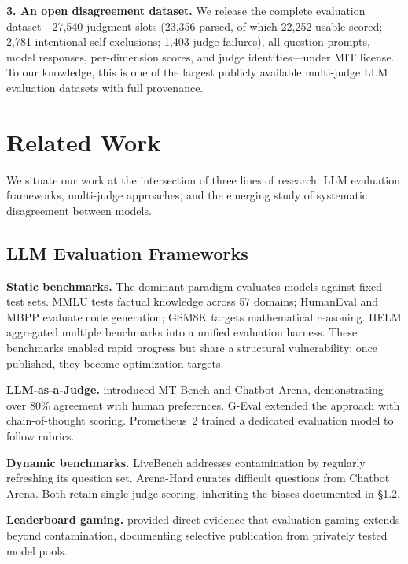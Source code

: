 \documentclass{article}
\begin{document}
\textbf{3. An open disagreement dataset.} We release the complete evaluation dataset---27,540 judgment slots (23,356 parsed, of which 22,252 usable-scored; 2,781 intentional self-exclusions; 1,403 judge failures), all question prompts, model responses, per-dimension scores, and judge identities---under MIT license. To our knowledge, this is one of the largest publicly available multi-judge LLM evaluation datasets with full provenance.


\section{Related Work}

We situate our work at the intersection of three lines of research: LLM evaluation frameworks, multi-judge approaches, and the emerging study of systematic disagreement between models.

\subsection{LLM Evaluation Frameworks}

\textbf{Static benchmarks.} The dominant paradigm evaluates models against fixed test sets. MMLU \citep{hendrycks2021measuring} tests factual knowledge across 57 domains; HumanEval \citep{chen2021evaluating} and MBPP \citep{austin2021program} evaluate code generation; GSM8K \citep{cobbe2021training} targets mathematical reasoning. HELM \citep{liang2023holistic} aggregated multiple benchmarks into a unified evaluation harness. These benchmarks enabled rapid progress but share a structural vulnerability: once published, they become optimization targets.

\textbf{LLM-as-a-Judge.} \citet{zheng2023judging} introduced MT-Bench and Chatbot Arena, demonstrating over 80\% agreement with human preferences. G-Eval \citep{liu2023geval} extended the approach with chain-of-thought scoring. Prometheus~2 \citep{kim2024prometheus} trained a dedicated evaluation model to follow rubrics.

\textbf{Dynamic benchmarks.} LiveBench \citep{white2025livebench} addresses contamination by regularly refreshing its question set. Arena-Hard \citep{li2024arenahard} curates difficult questions from Chatbot Arena. Both retain single-judge scoring, inheriting the biases documented in \S1.2.

\textbf{Leaderboard gaming.} \citet{singh2025leaderboard} provided direct evidence that evaluation gaming extends beyond contamination, documenting selective publication from privately tested model pools.
\end{document}
